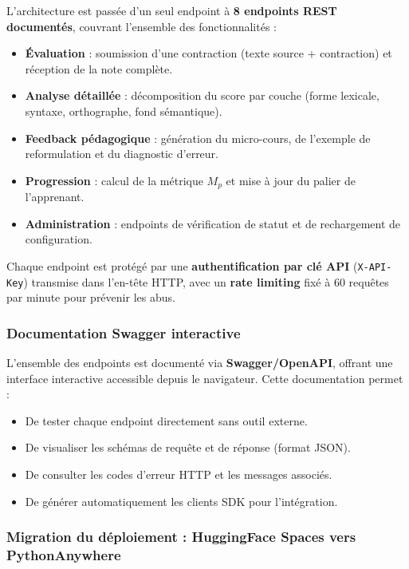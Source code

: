 L'architecture est passée d'un seul endpoint à \textbf{8 endpoints REST documentés}, couvrant l'ensemble des fonctionnalités :

\begin{itemize}
    \item \textbf{Évaluation} : soumission d'une contraction (texte source + contraction) et réception de la note complète.
    \item \textbf{Analyse détaillée} : décomposition du score par couche (forme lexicale, syntaxe, orthographe, fond sémantique).
    \item \textbf{Feedback pédagogique} : génération du micro-cours, de l'exemple de reformulation et du diagnostic d'erreur.
    \item \textbf{Progression} : calcul de la métrique \(M_p\) et mise à jour du palier de l'apprenant.
    \item \textbf{Administration} : endpoints de vérification de statut et de rechargement de configuration.
\end{itemize}

Chaque endpoint est protégé par une \textbf{authentification par clé API} (\texttt{X-API-Key}) transmise dans l'en-tête HTTP, avec un \textbf{rate limiting} fixé à 60 requêtes par minute pour prévenir les abus.

\subsubsection{Documentation Swagger interactive}

L'ensemble des endpoints est documenté via \textbf{Swagger/OpenAPI}, offrant une interface interactive accessible depuis le navigateur. Cette documentation permet :

\begin{itemize}
    \item De tester chaque endpoint directement sans outil externe.
    \item De visualiser les schémas de requête et de réponse (format JSON).
    \item De consulter les codes d'erreur HTTP et les messages associés.
    \item De générer automatiquement les clients SDK pour l'intégration.
\end{itemize}

\subsubsection{Migration du déploiement : HuggingFace Spaces vers PythonAnywhere}

